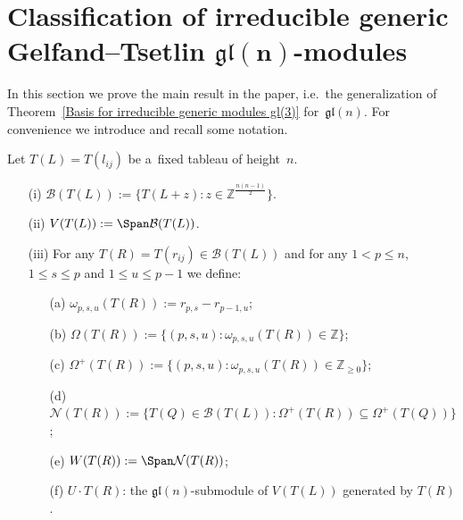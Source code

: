 \section[Classif\/ication of irreducible generic Gelfand--Tsetlin $\mathfrak{gl}(n)$-modules]{Classif\/ication of irreducible generic\\
Gelfand--Tsetlin $\boldsymbol{\mathfrak{gl}(n)}$-modules}
\label{section6}

In this section we prove the main result in the paper, i.e.~the generalization of Theorem~\ref{Basis for irreducible
generic modules gl(3)} for~$\mathfrak{gl}(n)$.
For convenience we introduce and recall some notation.

\begin{Notation}
\label{notation}
Let $T(L)=T(l_{ij})$ be a~f\/ixed tableau of height~$n$.
\begin{itemize}\itemsep=0pt
\item[(i)] $\mathcal{B}(T(L)):=\big\{T(L+z): z\in \mathbb{Z}^{\frac{n(n-1)}{2}}\big\}$.
\item[(ii)] $V(T(L)):= \Span \mathcal{B}(T(L))$.
\item[(iii)] For any $T(R)=T(r_{ij})\in \mathcal{B}(T(L))$ and for any $1<p\leq n$, $1\leq s\leq p$ and $1\leq u\leq
p-1$ we def\/ine:
\begin{itemize}\itemsep=0pt
\item[(a)] $\omega_{p,s,u}(T(R)):=r_{p,s}-r_{p-1,u}$;
\item[(b)] $\Omega(T(R)):=\{(p,s,u): \omega_{p,s,u}(T(R))\in \mathbb{Z}\}$;
\item[(c)] $\Omega^{+}(T(R)):=\{(p,s,u): \omega_{p,s,u}(T(R))\in \mathbb{Z}_{\geq 0}\}$;
\item[(d)] $\mathcal{N}(T(R)):=\{T(Q)\in \mathcal{B}(T(L)): \Omega^{+}(T(R))\subseteq \Omega^{+}(T(Q))\}$;
\item[(e)] $ W(T(R)):=\Span \mathcal{N}(T(R))$;
\item[(f)] $U\cdot T(R)$: the $\mathfrak{gl}(n)$-submodule of $V(T(L))$ generated by $T(R)$.
\end{itemize}
\end{itemize}
\end{Notation}

